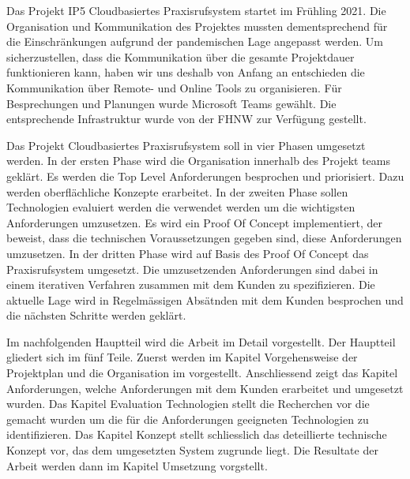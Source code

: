 Das Projekt IP5 Cloudbasiertes Praxisrufsystem startet im Frühling 2021.
Die Organisation und Kommunikation des Projektes mussten dementsprechend für die Einschränkungen aufgrund der pandemischen Lage angepasst werden.
Um sicherzustellen, dass die Kommunikation über die gesamte Projektdauer funktionieren kann, haben wir uns deshalb von Anfang an entschieden die Kommunikation über Remote- und Online Tools zu organisieren.
Für Besprechungen und Planungen wurde Microsoft Teams gewählt.
Die entsprechende Infrastruktur wurde von der FHNW zur Verfügung gestellt.

Das Projekt Cloudbasiertes Praxisrufsystem soll in vier Phasen umgesetzt werden.
In der ersten Phase wird die Organisation innerhalb des Projekt teams geklärt.
Es werden die Top Level Anforderungen besprochen und priorisiert.
Dazu werden oberflächliche Konzepte erarbeitet.
In der zweiten Phase sollen Technologien evaluiert werden die verwendet werden um die wichtigsten Anforderungen umzusetzen.
Es wird ein Proof Of Concept implementiert, der beweist, dass die technischen Voraussetzungen gegeben sind, diese Anforderungen umzusetzen.
In der dritten Phase wird auf Basis des Proof Of Concept das Praxisrufsystem umgesetzt.
Die umzusetzenden Anforderungen sind dabei in einem iterativen Verfahren zusammen mit dem Kunden zu spezifizieren.
Die aktuelle Lage wird in Regelmässigen Absätnden mit dem Kunden besprochen und die nächsten Schritte werden geklärt.

Im nachfolgenden Hauptteil wird die Arbeit im Detail vorgestellt.
Der Hauptteil gliedert sich im fünf Teile.
Zuerst werden im Kapitel Vorgehensweise der Projektplan und die Organisation im vorgestellt.
Anschliessend zeigt das Kapitel Anforderungen, welche Anforderungen mit dem Kunden erarbeitet und umgesetzt wurden.
Das Kapitel Evaluation Technologien stellt die Recherchen vor die gemacht wurden um die für die Anforderungen geeigneten Technologien zu identifizieren.
Das Kapitel Konzept stellt schliesslich das deteillierte technische Konzept vor, das dem umgesetzten System zugrunde liegt.
Die Resultate der Arbeit werden dann im Kapitel Umsetzung vorgstellt.


\clearpage
